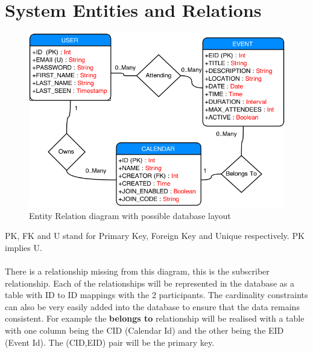 \documentclass[11pt,a4paper]{article}
\begin{document}
\section{System Entities and Relations} 
\label{sec:er}
\begin{figure}[H]
\centerline{\includegraphics[scale=0.58,trim=0 0 100 0]{er}}
\caption{Entity Relation diagram with possible database layout}
\end{figure}
PK, FK and U stand for Primary Key, Foreign Key and Unique respectively. PK implies U.
\\
\\
\noindent
There is a relationship missing from this diagram, this is the subscriber relationship. Each of the relationships will be represented in the database as a table with ID to ID mappings with the 2 participants. The cardinality constraints can also be very easily added into the database to ensure that the data remains consistent. For example the \textbf{belongs to} relationship will be realised with a table with one column being the CID (Calendar Id) and the other being the EID (Event Id). The (CID,EID) pair will be the primary key.
\newpage
\end{document}
